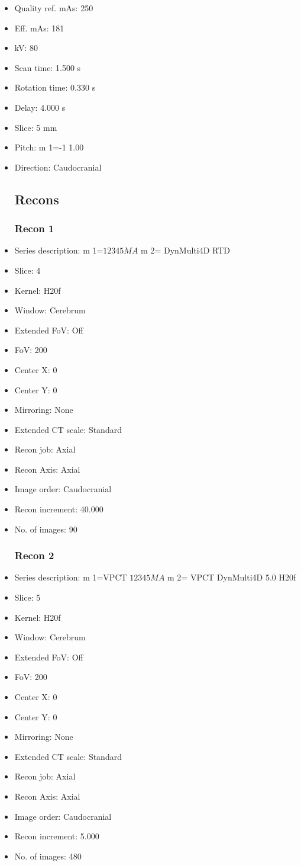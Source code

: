 \documentclass[12pt]{article}
\begin{document}
\begin{itemize}
\subsection{Scan}
\item Quality ref. mAs: 250\item Eff. mAs: 181\item kV: 80\item Scan time: 1.500 s\item Rotation time: 0.330 s\item Delay: 4.000 s\item Slice: 5 mm\item Pitch: m 1=-1 1.00\item Direction: Caudocranial\subsection{Recons}

\subsubsection{Recon 1}
\item Series description: m 1=$1$$2$$3$$4$$5$$M$$A$ m 2= DynMulti4D RTD
\item Slice: 4
\item Kernel: H20f
\item Window: Cerebrum
\item Extended FoV: Off
\item FoV: 200
\item Center X: 0
\item Center Y: 0
\item Mirroring: None
\item Extended CT scale: Standard
\item Recon job: Axial
\item Recon Axis: Axial
\item Image order: Caudocranial
\item Recon increment: 40.000
\item No. of images: 90
\subsubsection{Recon 2}
\item Series description: m 1=VPCT $1$$2$$3$$4$$5$$M$$A$ m 2= VPCT DynMulti4D 5.0 H20f
\item Slice: 5
\item Kernel: H20f
\item Window: Cerebrum
\item Extended FoV: Off
\item FoV: 200
\item Center X: 0
\item Center Y: 0
\item Mirroring: None
\item Extended CT scale: Standard
\item Recon job: Axial
\item Recon Axis: Axial
\item Image order: Caudocranial
\item Recon increment: 5.000
\item No. of images: 480

\end{itemize}
\end{document}
